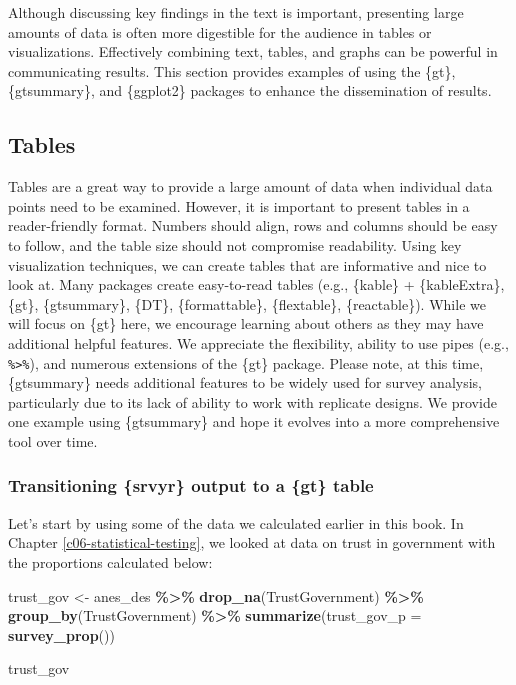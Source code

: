 \documentclass[
]{krantz}
\makeatletter
\newenvironment{Shaded}{\begin{snugshade}}{\end{snugshade}}
\newcommand{\AttributeTok}[1]{\textcolor[rgb]{0.27,0.27,0.27}{#1}}
\newcommand{\FunctionTok}[1]{\textcolor[rgb]{0.27,0.27,0.27}{\textbf{#1}}}
\newcommand{\NormalTok}[1]{#1}
\newcommand{\OtherTok}[1]{\textcolor[rgb]{0.37,0.37,0.37}{#1}}
\newcommand{\SpecialCharTok}[1]{\textcolor[rgb]{0.43,0.43,0.43}{\textbf{#1}}}
\newenvironment{kframe}{%
\medskip{}
\setlength{\fboxsep}{.8em}
 \def\at@end@of@kframe{}%
 \ifinner\ifhmode%
  \def\at@end@of@kframe{\end{minipage}}%
  \begin{minipage}{\columnwidth}%
 \fi\fi%
 \def\FrameCommand##1{\hskip\@totalleftmargin \hskip-\fboxsep
 \colorbox{shadecolor}{##1}\hskip-\fboxsep
     \hskip-\linewidth \hskip-\@totalleftmargin \hskip\columnwidth}%
 \MakeFramed {\advance\hsize-\width
   \@totalleftmargin\z@ \linewidth\hsize
   \@setminipage}}%
 {\par\unskip\endMakeFramed%
 \at@end@of@kframe}
\renewenvironment{Shaded}{\begin{kframe}}{\end{kframe}}
\makeatother
\begin{document}
Although discussing key findings in the text is important, presenting large amounts of data is often more digestible for the audience in tables or visualizations. Effectively combining text, tables, and graphs can be powerful in communicating results. This section provides examples of using the \{gt\}, \{gtsummary\}, and \{ggplot2\} packages to enhance the dissemination of results.

\hypertarget{tables}{%
\subsection{Tables}\label{tables}}

Tables are a great way to provide a large amount of data when individual data points need to be examined. However, it is important to present tables in a reader-friendly format. Numbers should align, rows and columns should be easy to follow, and the table size should not compromise readability. Using key visualization techniques, we can create tables that are informative and nice to look at. Many packages create easy-to-read tables (e.g., \{kable\} + \{kableExtra\}, \{gt\}, \{gtsummary\}, \{DT\}, \{formattable\}, \{flextable\}, \{reactable\}). While we will focus on \{gt\} here, we encourage learning about others as they may have additional helpful features. We appreciate the flexibility, ability to use pipes (e.g., \texttt{\%\textgreater{}\%}), and numerous extensions of the \{gt\} package. Please note, at this time, \{gtsummary\} needs additional features to be widely used for survey analysis, particularly due to its lack of ability to work with replicate designs. We provide one example using \{gtsummary\} and hope it evolves into a more comprehensive tool over time.

\hypertarget{results-gt}{%
\subsubsection{Transitioning \{srvyr\} output to a \{gt\} table}\label{results-gt}}

Let's start by using some of the data we calculated earlier in this book. In Chapter \ref{c06-statistical-testing}, we looked at data on trust in government with the proportions calculated below:

\begin{Shaded}
\begin{Highlighting}[]
\NormalTok{trust\_gov }\OtherTok{\textless{}{-}}\NormalTok{ anes\_des }\SpecialCharTok{\%\textgreater{}\%}
  \FunctionTok{drop\_na}\NormalTok{(TrustGovernment) }\SpecialCharTok{\%\textgreater{}\%}
  \FunctionTok{group\_by}\NormalTok{(TrustGovernment) }\SpecialCharTok{\%\textgreater{}\%}
  \FunctionTok{summarize}\NormalTok{(}\AttributeTok{trust\_gov\_p =} \FunctionTok{survey\_prop}\NormalTok{())}

\NormalTok{trust\_gov}
\end{Highlighting}
\end{Shaded}
\end{document}
